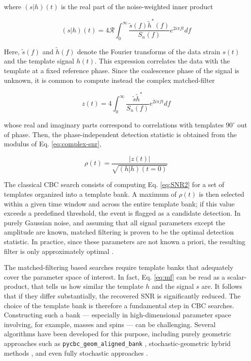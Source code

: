\documentclass[aps,prd,twocolumn,superscriptaddress,nofootinbib, longbibliography]{revtex4-2}
\begin{document}
	 where $(s|h)(t)$ is the real part of the noise-weighted inner product
	
\begin{equation}
	(s|h)(t) = 4 \mathcal{R} \int_0^{\infty} \frac{\tilde{s}(f) \tilde{h}^*(f)}{S_n(f)}e^{2 i \pi f t}df
	\label{eq:mf}
\end{equation}

	Here, $\tilde{s}(f)$ and $\tilde{h}(f)$ denote the Fourier transforms of the data strain $s(t)$ and the template signal $h(t)$. This expression correlates the data with the template at a fixed reference phase. Since the coalescence phase of the signal is unknown, it is common to compute instead the complex matched-filter
	
\begin{equation}
	z(t) = 4 \int_0^\infty \frac{\tilde{s} \tilde{h}^*}{S_n(f)} e^{2 i \pi f t} df
	\label{eq:complex-snr}
\end{equation}
	
	whose real and imaginary parts correspond to correlations with templates $90^{\circ}$ out of phase. Then, the phase-independent detection statistic is obtained from the modulus of Eq. \ref{eq:complex-snr},
	
\begin{equation}
	\rho(t) = \frac{| z(t) |}{\sqrt{(h|h)(t=0)}}
	\label{eq:SNR2}
\end{equation}
	
	The classical CBC search consists of computing Eq. \ref{eq:SNR2} for a set of templates organized into a template bank. A maximum of $\rho(t)$ is then selected within a given time window and across the entire template bank; if this value exceeds a predefined threshold, the event is flagged as a candidate detection. In purely Gaussian noise, and assuming that all signal parameters except the amplitude are known, matched filtering is proven to be the optimal detection statistic. In practice, since these parameters are not known a priori, the resulting filter is only approximately optimal \cite{matched_filtering}. 
	
	The matched-filtering based searches require template banks that adequately cover the parameter space of interest. In fact, Eq. \ref{eq:mf} can be read as a scalar-product, that tells us how similar the template $h$ and the signal $s$ are. It follows that if they differ substantially, the recovered SNR is significantly reduced.
	The choice of the template bank is therefore a fundamental step in CBC searches. Constructing such a bank --- especially in high-dimensional parameter space involving, for example, masses and spins --- can be challenging. Several algorithms have been developed for this purpose, including purely geometric approaches such as \verb|pycbc_geom_aligned_bank| \cite{harry2014, bnsspins2012}, stochastic-geometric hybrid methods \cite{template_banks_2019}, and even fully stochastic approaches \cite{stochastic_bank_2024}.
	
\end{document}
